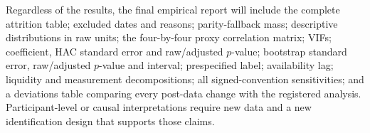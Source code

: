 \documentclass[11pt]{article}
\begin{document}
Regardless of the results, the final empirical report will include the complete attrition
table; excluded dates and reasons; parity-fallback mass; descriptive distributions in raw
units; the four-by-four proxy correlation matrix; VIFs; coefficient, HAC standard error and
raw/adjusted $p$-value; bootstrap standard error, raw/adjusted $p$-value and interval;
prespecified label; availability lag; liquidity and measurement decompositions; all
signed-convention sensitivities; and a deviations table comparing every post-data change
with the registered analysis.  Participant-level or causal interpretations require new data
and a new identification design that supports those claims.

{\small
\setlength{\bibsep}{0.25em}

}
\end{document}

